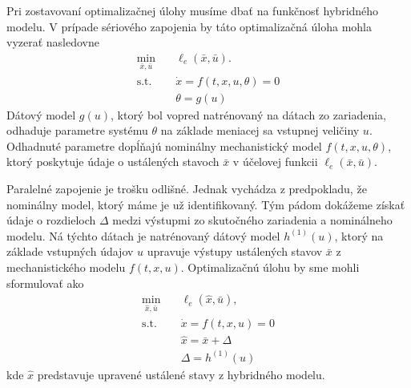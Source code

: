 Pri zostavovaní optimalizačnej úlohy musíme dbať na funkčnosť hybridného modelu. V prípade sériového zapojenia by táto optimalizačná úloha mohla vyzerať nasledovne
\begin{equation}
	\begin{split}
		\min_{\bar{x},\bar{u}} &\quad \ell_e\left(\bar{x},\bar{u}\right).\\
		\text{s.t.} &\quad \dot{x} = f\left(t,x,u,\theta\right) = 0\\
		&\quad \theta = g(u)
	\end{split}
\end{equation}
Dátový model $ g(u) $, ktorý bol vopred natrénovaný na dátach zo zariadenia, odhaduje parametre systému $ \theta $ na základe meniacej sa vstupnej veličiny $ u $. Odhadnuté parametre dopĺňajú nominálny mechanistický model $ f(t,x,u,\theta) $, ktorý poskytuje údaje o ustálených stavoch $ \bar{x} $ v účelovej funkcii $ \ell_e\left(\bar{x},\bar{u}\right) $. 

Paralelné zapojenie je trošku odlišné. Jednak vychádza z predpokladu, že nominálny model, ktorý máme je už identifikovaný. Tým pádom dokážeme získať údaje o rozdieloch $ \Delta $ medzi výstupmi zo skutočného zariadenia a nominálneho modelu. Ná týchto dátach je natrénovaný dátový model $ h^{(1)}(u) $, ktorý na základe vstupných údajov $ u $ upravuje výstupy ustálených stavov $ \bar{x} $ z mechanistického modelu $ f(t,x,u) $. Optimalizačnú úlohu by sme mohli sformulovať ako
\begin{equation}
	\begin{split}
		\min_{\hat{x},\bar{u}} &\quad \ell_e\left(\hat{x},\bar{u}\right),\\
		\text{s.t.} &\quad \dot{x} = f\left(t,x,u\right) = 0\\
		&\quad \hat{x} = \bar{x} + \Delta\\
		&\quad \Delta = h^{(1)}(u)
	\end{split}
\end{equation}
kde $ \hat{x} $ predstavuje upravené ustálené stavy z hybridného modelu.

